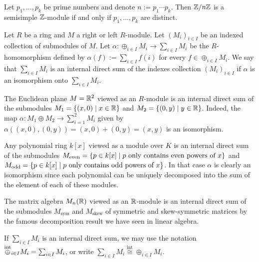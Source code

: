 \documentclass[11pt,a4paper]{article}
\begin{document}
\begin{example}
  Let $p_1,\dots,p_k$ be prime numbers and denote $n := p_1 \cdots p_k$.
  Then $\mathbb{Z}/n\mathbb{Z}$ is a semisimple $\mathbb{Z}$-module if and only if $p_1,\dots,p_k$
  are distinct.
\end{example}

\begin{definition}
  Let $R$ be a ring and $M$ a right or left $R$-module.
  Let $(M_i)_{i \in I}$ be an indexed collection of submodules of $M$.
  Let $\alpha \colon \oplus_{i \in I} M_i \to \sum_{i \in I} M_i$
  be the $R$-homomorphism defined by $\alpha(f) := \sum_{i \in I} f(i)$
  for every $f \in \oplus_{i \in I} M_i$.
  We say that $\sum_{i \in I} M_i$ is an internal direct sum of the indexes
  collection $(M_i)_{i \in I}$ if $\alpha$ is an isomorphism onto $\sum_{i \in I} M_i$.
\end{definition}

\begin{example}
  The Euclidean plane $M = \mathbb{R}^2$ viewed as an $R$-module is an internal direct sum
  of the submodules $M_1 = \{(x,0) \mid x \in \mathbb{R}\}$ and $M_2 = \{(0,y) \mid y \in \mathbb{R}\}$.
  Indeed, the map $\alpha \colon M_1 \oplus M_2 \to \sum_{i=1}^{2} M_i$ 
  given by $\alpha((x,0),(0,y)) = (x,0) + (0,y) = (x,y)$ is an isomorphism.
\end{example}

\begin{example}
  Any polynomial ring $k[x]$ viewed as a module over $K$ is an internal direct sum
  of the submodules $M_{\operatorname{even}} = \{p \in k[x] \mid p \text{ only contains even powers
  of } x\}$ and $M_{\operatorname{odd}} = \{p \in k[x] \mid p \text{ only contains odd powers
  of } x\}$.
  In that case $\alpha$ is clearly an isomorphism since each polynomial can be uniquely
  decomposed into the sum of the element of each of these modules.
\end{example}

\begin{example}
  The matrix algebra $M_n(\mathbb{R})$ viewed as an $\mathbb{R}$-module is an internal
  direct sum of the submodules $M_{\mathrm{sym}}$ and $M_{\mathrm{skew}}$
  of symmetric and skew-symmetric matrices by the famous decomposition result
  we have seen in linear algebra.
\end{example}

\begin{remark}
  If $\sum_{i \in I} M_i$ is an internal direct sum,
  we may use the notation $\overset{\text{int}}{\oplus}_{i \in I} M_i = \sum_{i \in I} M_i$,
  or write $\sum_{i \in I} M_i \overset{\text{int}}{\cong} \oplus_{i \in I} M_i$.
\end{remark}
\end{document}
